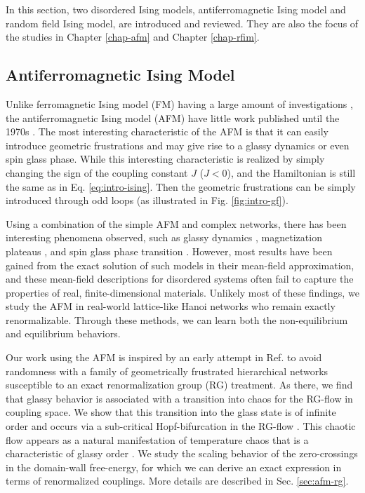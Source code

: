 In this section, two disordered Ising models, antiferromagnetic Ising model and random field Ising model,  are introduced and reviewed. They are also the focus of the studies in Chapter \ref{chap-afm} and Chapter \ref{chap-rfim}.


\subsection{Antiferromagnetic Ising Model}
\label{sec:intro-afm}
Unlike ferromagnetic Ising model (FM) having a large amount of investigations \cite{niss2005history, mccoy2014two}, the antiferromagnetic Ising model (AFM) have little work published until the 1970s \cite{penney2003new}. The most interesting characteristic of the AFM is that it can easily introduce geometric frustrations and may give rise to a glassy dynamics or even spin glass phase. While this interesting characteristic is realized by simply changing the sign of the coupling constant $J$ ($J<0$), and the Hamiltonian is still the same as in Eq. \ref{eq:intro-ising}. Then the geometric frustrations can be simply introduced through odd loops (as illustrated in Fig. \ref{fig:intro-gf}).

Using a combination of the simple AFM and complex networks, there has been interesting phenomena observed, such as glassy dynamics \cite{shokef2011}, magnetization plateaus \cite{ohanyan2003mag}, and spin glass phase transition \cite{herrero2008afm}. However, most results have been gained from the exact solution of such models in their mean-field
approximation, and these mean-field descriptions for disordered systems often fail to capture the properties of real, finite-dimensional materials.  Unlikely most of these findings, we study the AFM in real-world lattice-like Hanoi networks who remain exactly renormalizable. Through these methods, we can learn both the non-equilibrium and equilibrium behaviors. 

Our work using the AFM is inspired by an early attempt in Ref. \cite{mckay1982spin} to avoid randomness with a family of geometrically frustrated hierarchical networks susceptible to an exact renormalization group (RG) treatment. As there, we find that glassy behavior is associated
with a transition into chaos for the RG-flow in coupling space. We
show that this transition into the glass state is of infinite order
and occurs via a sub-critical Hopf-bifurcation in the RG-flow \cite{weinrib1983critical}.
This chaotic flow appears as a natural manifestation of temperature
chaos that is a characteristic of glassy order  \cite{bray1987chaotic, thomas2011zero}.
We study the scaling behavior of the zero-crossings in the domain-wall
free-energy, for which we can derive an exact expression in terms
of renormalized couplings. More details are described in Sec. \ref{sec:afm-rg}.



